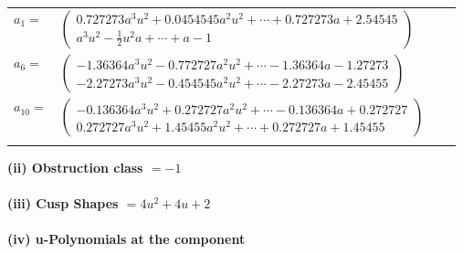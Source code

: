 \documentclass[1p]{elsarticle_modified}
\theoremstyle{definition}
\begin{document}
\begin{tabular}{m{7pt} m{180pt} m{7pt} m{180pt} }
\flushright $a_{1}=$&$\begin{pmatrix}0.727273 a^{3} u^{2}+0.0454545 a^{2} u^{2}+\cdots+0.727273 a+2.54545\\a^3 u^2-\frac{1}{2} u^2 a+\cdots+a-1\end{pmatrix}$ \\
\flushright $a_{6}=$&$\begin{pmatrix}-1.36364 a^{3} u^{2}-0.772727 a^{2} u^{2}+\cdots-1.36364 a-1.27273\\-2.27273 a^{3} u^{2}-0.454545 a^{2} u^{2}+\cdots-2.27273 a-2.45455\end{pmatrix}$ \\
\flushright $a_{10}=$&$\begin{pmatrix}-0.136364 a^{3} u^{2}+0.272727 a^{2} u^{2}+\cdots-0.136364 a+0.272727\\0.272727 a^{3} u^{2}+1.45455 a^{2} u^{2}+\cdots+0.272727 a+1.45455\end{pmatrix}$\\&\end{tabular}
\flushleft \textbf{(ii) Obstruction class $= -1$}\\~\\
\flushleft \textbf{(iii) Cusp Shapes $= 4 u^2+4 u+2$}\\~\\
\newpage\renewcommand{\arraystretch}{1}
\flushleft \textbf{(iv) u-Polynomials at the component}\newline \\
\end{document}
